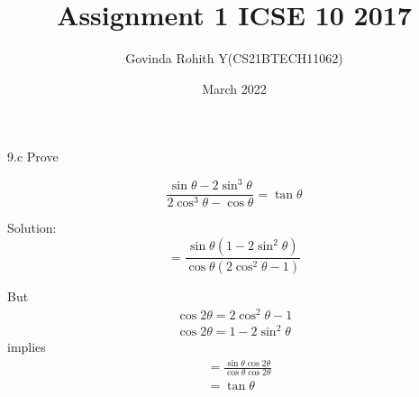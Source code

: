 \documentclass{article}
\title{Assignment 1 ICSE 10 2017}
\author{Govinda Rohith Y(CS21BTECH11062)}
\date{March 2022}
\begin{document}
\maketitle

\begin{multicols}{2}


9.c Prove 

\begin{equation*}
\frac{\sin\theta-2\sin^3\theta}{2\cos^3\theta-\cos\theta}=\tan\theta
\end{equation*}
\large

Solution:\\ 
\normalsize
\begin{equation}
=\frac{\sin\theta(1-2\sin^2\theta)}{\cos\theta(2\cos^2\theta-1)}
\end{equation}

But
\begin{align}
\cos2\theta=2\cos^2\theta-1\\ 
\cos2\theta=1-2\sin^2\theta
\end{align}
implies
\begin{align}
&=\frac{\sin\theta \cos2\theta}{\cos\theta \cos2\theta}\\
&=\tan\theta
\end{align}
\end{multicols}
\end{document}
